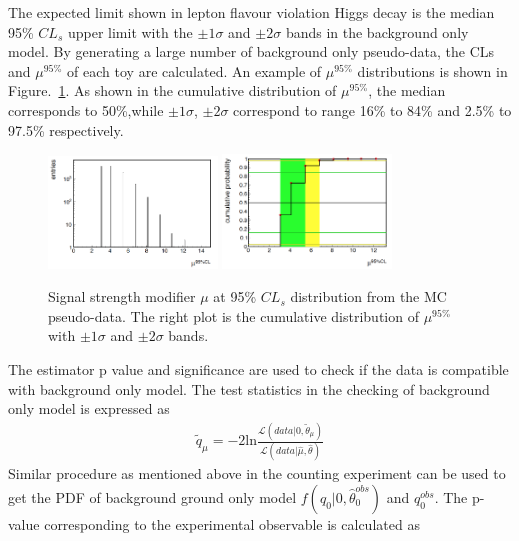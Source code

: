 The expected limit shown in lepton flavour violation Higgs decay is the median 95\% $CL_{s}$ upper limit with the $\pm 1 \sigma$ and $\pm 2 \sigma$ bands in the background only model. By generating a large number of background only pseudo-data, the CLs and $\mu^{95\%}$ of each toy are calculated. An example of $\mu^{95\%}$ distributions is shown in Figure.~\ref{fig:Signal_strength_example}. As shown in the cumulative distribution of $\mu^{95\%}$, the median corresponds to 50\%,while $\pm 1 \sigma$, $\pm 2 \sigma$  correspond to range 16\% to 84\% and 2.5\% to 97.5\% respectively.     
\begin{figure}[!tbp] 
\centering
\includegraphics[width=0.4\textwidth]{chapter7/Signal_strength_example_1.png}
\includegraphics[width=0.4\textwidth]{chapter7/Signal_strength_example_2.png}
\caption{Signal strength modifier $\mu$ at 95\% $CL_{s}$ distribution from the MC pseudo-data. The right plot is the cumulative distribution of $\mu^{95\%}$ with $\pm 1 \sigma$ and $\pm 2 \sigma$ bands.}
\label{fig:Signal_strength_example}
\end{figure}

The estimator p value and significance are used to check if the data is compatible with background only model. The test statistics in the checking of background only model is expressed as
\begin{align*}
\tilde{q}_{\mu}=-2\textrm{ln}\frac{\mathcal{L}(data|0,\tilde{\theta}_{\mu})}{\mathcal{L}(data|\hat{\mu},\hat{\theta})}
\end{align*}
Similar procedure as mentioned above in the counting experiment can be used to get the PDF of background ground only model $f(q_{0}|0,\hat{\theta}^{obs}_{0})$ and $q^{obs}_{0}$. The p-value corresponding to the experimental observable is calculated as

